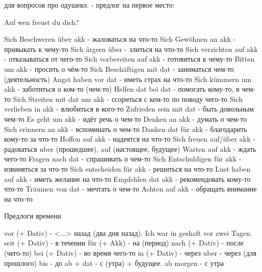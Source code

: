 \documentclass[12pt]{report}
\begin{document}
для вопросов про одушевл. - предлог на первое место:

Auf wen freust du dich?

Sich Beschweren über akk - жаловаться на что-то
Sich Gewöhnen an akk - привыкать к чему-то
Sich ärgern über - злиться на что-то
Sich verzichten auf akk - отказываться от чего-то
Sich vorbereiten auf akk - готовиться к чему-то
Bitten um akk - просить о чём-то
Sich Beschäftigen mit dat - заниматься чем-то (деятельность)
Angst haben vor dat - иметь страх на что-то
Sich kümmern um akk - заботиться о ком-то (чем-то)
Helfen dat bei dat - помогать кому-то, в чем-то
Sich Streiten mit dat um akk - ссориться с кем-то по поводу чего-то
Sich verlieben in akk - влюбиться в кого-то
Zufrieden sein mit dat - быть довольным чем-то
Es geht um akk - идёт речь о чем-то
Denken an akk - думать о чем-то
Sich erinnern an akk - вспоминать о чем-то
Danken dat für akk - благодарить кому-то за что-то
Hoffen auf akk - надеятся на что-то
Sich freuen auf/über akk - радоваться uber (прошедшее), auf (настоящее, будущее)
Warten auf akk - ждать чего-то
Fragen nach dat - спрашивать о чем-то
Sich Entschuldigen für akk - извиняться за что-то
Sich entscheiden für akk - решиться на что-то
Lust haben auf akk - иметь желание на что-то
Empfehlen dat akk - рекомендовать кому-то что-то
Träumen von dat - мечтать о чем-то
Achten auf akk - обращать внимание на что-то

Предлоги времени

vor (+ Dativ) - <...> назад (два дня назад). Ich war in geshaft vor zwei Tagen.
seit (+ Dativ) - в течении 
für (+ Akk) - на (период)
nach (+ Dativ) - после (чего-то)
bei (+ Dativ) - во время чего-то
in (+ Dativ) - через
uber - через (для прошлого)
bis - до 
ab + dat - с (утра) + будущее. ab morgen - с утра
\end{document}
